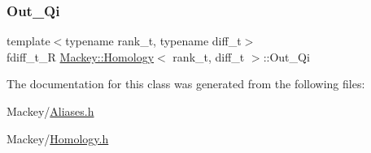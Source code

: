 \subsubsection{\texorpdfstring{Out\+\_\+\+Qi}{Out\_Qi}}
{\footnotesize\ttfamily template$<$typename rank\+\_\+t, typename diff\+\_\+t$>$ \\
fdiff\+\_\+t\+\_\+R \hyperlink{classMackey_1_1Homology}{Mackey\+::\+Homology}$<$ rank\+\_\+t, diff\+\_\+t $>$\+::Out\+\_\+\+Qi}



The documentation for this class was generated from the following files\+:\begin{DoxyCompactItemize}
\item 
Mackey/\hyperlink{Aliases_8h}{Aliases.\+h}\item 
Mackey/\hyperlink{Homology_8h}{Homology.\+h}\end{DoxyCompactItemize}
